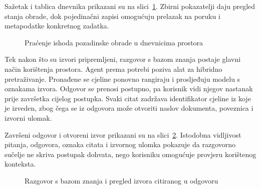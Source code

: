 Sažetak i tablica dnevnika prikazani su na slici~\ref{fig:dnevnici-obrade}. Zbirni pokazatelji daju pregled stanja obrade, dok pojedinačni zapisi omogućuju prelazak na poruku i metapodatke konkretnog zadatka.

\begin{figure}[H]
    \centering
    \caption{Praćenje ishoda pozadinske obrade u dnevnicima prostora}
    \label{fig:dnevnici-obrade}
\end{figure}

Tek nakon što su izvori pripremljeni, razgovor s bazom znanja postaje glavni način korištenja prostora. Agent prema potrebi poziva alat za hibridno pretraživanje. Pronađene se cjeline ponovno rangiraju i prosljeđuju modelu s oznakama izvora. Odgovor se prenosi postupno, pa korisnik vidi njegov nastanak prije završetka cijelog postupka. Svaki citat zadržava identifikator cjeline iz koje je izveden, zbog čega se iz odgovora može otvoriti naslov dokumenta, poveznica i izvorni ulomak.


Završeni odgovor i otvoreni izvor prikazani su na slici~\ref{fig:razgovor-citati}. Istodobna vidljivost pitanja, odgovora, oznaka citata i izvornog ulomka pokazuje da razgovorno sučelje ne skriva postupak dohvata, nego korisniku omogućuje provjeru korištenog konteksta.

\begin{figure}[H]
    \centering
    \caption{Razgovor s bazom znanja i pregled izvora citiranog u odgovoru}
    \label{fig:razgovor-citati}
\end{figure}

